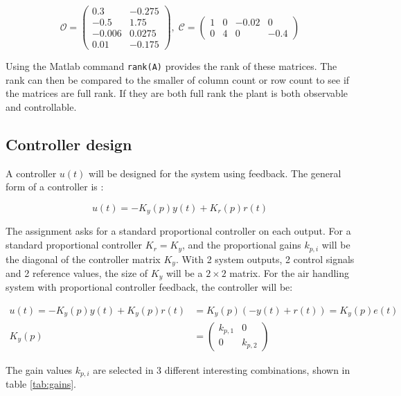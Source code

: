 \documentclass[a4paper, titlepage]{article}
\begin{document}
\begin{equation}
\mathcal{O} = 
\begin{pmatrix}
0.3 & -0.275		\\
-0.5 & 1.75		\\
-0.006 & 0.0275	\\
0.01 & -0.175
\end{pmatrix}
,\;
\mathcal{C} = 
\begin{pmatrix}
1 & 0 & -0.02 & 0 \\
0 & 4 & 0 & -0.4
\end{pmatrix}
\end{equation}

Using the Matlab command \verb|rank(A)| provides the rank of these matrices.
The rank can then be compared to the smaller of column count or row count to see if the matrices are full rank.
If they are both full rank the plant is both observable and controllable.

\subsection{Controller design}
A controller $u(t)$ will be designed for the system using feedback.
The general form of a controller is \citep[p.~147]{glad00}:

\begin{equation}
u(t) = -K_y(p)y(t) + K_r(p)r(t)
\end{equation}

The assignment asks for a standard proportional controller on each output.
For a standard proportional controller $K_r = K_y$, and the proportional gains $k_{p,i}$ will be the diagonal of the controller matrix $K_y$.
With 2 system outputs, 2 control signals and 2 reference values, the size of $K_y$ will be a $2 \times 2$ matrix.
For the air handling system with proportional controller feedback, the controller will be:

\begin{equation}
\begin{split}
u(t) = -K_y(p)y(t) + K_y(p)r(t) &= 
K_y(p)(-y(t) + r(t)) = 
K_y(p)e(t) \\
K_y(p) &= 
\begin{pmatrix}
k_{p,1} 	& 	0 		\\
0 		&	k_{p,2}	
\end{pmatrix}
\end{split}
\end{equation}

The gain values $k_{p,i}$ are selected in 3 different interesting combinations, shown in table \ref{tab:gains}.
\end{document}
